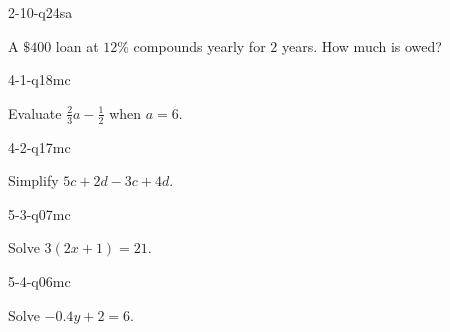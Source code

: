 \begin{practiceQuestion}{2-10-q24}{sa}
\begin{questionText}
A $\$400$ loan at $12\%$ compounds yearly for $2$ years. How much is owed?
\end{questionText}
\end{practiceQuestion}

\begin{practiceQuestion}{4-1-q18}{mc}
\begin{questionText}
Evaluate $\frac{2}{3}a - \frac{1}{2}$ when $a = 6$.


\begin{center}
\hspace{1cm}
\end{center}
\end{questionText}
\end{practiceQuestion}

\begin{practiceQuestion}{4-2-q17}{mc}
\begin{questionText}
Simplify $5c + 2d - 3c + 4d$.
\end{questionText}
\end{practiceQuestion}

\begin{practiceQuestion}{5-3-q07}{mc}
\begin{questionText}
Solve $3(2x + 1) = 21$.
\end{questionText}
\end{practiceQuestion}

\begin{practiceQuestion}{5-4-q06}{mc}
\begin{questionText}
Solve $-0.4y + 2 = 6$.
\end{questionText}
\end{practiceQuestion}

